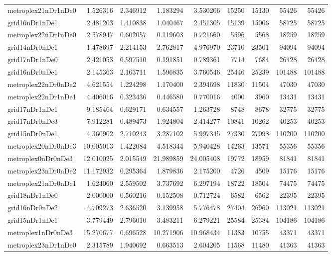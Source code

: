 \begin{longtable}{|l|r|r|r|r|r|r|r|r|}
metroplex21nDr1nDe0 & 1.526316 & 2.346912 & 1.183294 & 3.530206 & 15250 & 15130 & 55426 & 55426 \\
grid16nDr1nDe1 & 2.481203 & 1.410838 & 1.040467 & 2.451305 & 15139 & 15006 & 58725 & 58725 \\
metroplex22nDr1nDe0 & 2.578947 & 0.602057 & 0.119603 & 0.721660 & 5596 & 5568 & 18259 & 18259 \\
grid14nDr0nDe1 & 1.478697 & 2.214153 & 2.762817 & 4.976970 & 23710 & 23501 & 94094 & 94094 \\
grid17nDr1nDe0 & 2.421053 & 0.597510 & 0.191851 & 0.789361 & 7714 & 7684 & 26428 & 26428 \\
grid16nDr0nDe1 & 2.145363 & 2.163711 & 1.596835 & 3.760546 & 25446 & 25239 & 101488 & 101488 \\
metroplex22nDr0nDe2 & 4.621554 & 1.224298 & 1.170400 & 2.394698 & 11830 & 11504 & 47030 & 47030 \\
metroplex22nDr1nDe1 & 4.406016 & 0.323436 & 0.446580 & 0.770016 & 4000 & 3960 & 13431 & 13431 \\
grid17nDr1nDe1 & 9.185464 & 0.629171 & 0.634557 & 1.263728 & 8748 & 8678 & 32775 & 32775 \\
grid17nDr0nDe3 & 7.912281 & 0.489473 & 1.924804 & 2.414277 & 10841 & 10262 & 40253 & 40253 \\
grid15nDr0nDe1 & 4.360902 & 2.710243 & 3.287102 & 5.997345 & 27330 & 27098 & 110200 & 110200 \\
metroplex20nDr0nDe3 & 10.005013 & 1.422084 & 4.518344 & 5.940428 & 14263 & 13571 & 55356 & 55356 \\
metroplex0nDr0nDe3 & 12.010025 & 2.015549 & 21.989859 & 24.005408 & 19772 & 18959 & 81841 & 81841 \\
metroplex23nDr0nDe2 & 11.172932 & 0.295364 & 1.879836 & 2.175200 & 4726 & 4509 & 15176 & 15176 \\
metroplex21nDr0nDe1 & 1.624060 & 2.559502 & 3.737692 & 6.297194 & 18722 & 18504 & 74475 & 74475 \\
grid18nDr1nDe0 & 2.000000 & 0.560216 & 0.152508 & 0.712724 & 6582 & 6562 & 22395 & 22395 \\
grid16nDr0nDe2 & 4.709273 & 2.636520 & 3.139958 & 5.776478 & 27404 & 26960 & 113021 & 113021 \\
grid15nDr1nDe1 & 3.779449 & 2.796010 & 3.483211 & 6.279221 & 25584 & 25384 & 104186 & 104186 \\
metroplex1nDr0nDe3 & 15.270677 & 0.696528 & 10.271906 & 10.968434 & 11383 & 10755 & 43371 & 43371 \\
metroplex23nDr1nDe0 & 2.315789 & 1.940692 & 0.663513 & 2.604205 & 11568 & 11480 & 41363 & 41363 \\

\end{longtable}
